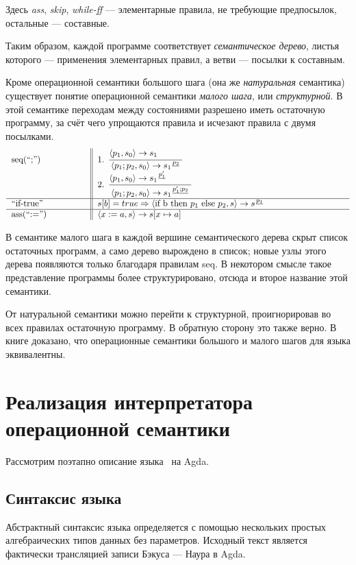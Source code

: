 \documentclass[aps,12pt,final,oneside,onecolumn,musixtex,superscriptaddress,centertags]{article}
\newcommand{\ccode}[1]{\mbox{\texttt{#1}}}
\begin{document}
    Здесь \emph{ass}, \emph{skip}, \emph{while-ff} --- элементарные правила, не требующие предпосылок, остальные --- составные.

    Таким образом, каждой программе соответствует \emph{семантическое дерево}, листья которого --- применения элементарных правил, а ветви --- посылки к составным.

    \vspace{4mm}
    Кроме операционной семантики большого шага (она же \emph{натуральная} семантика) существует понятие операционной семантики \emph{малого шага}, или \emph{структурной}. В этой семантике переходам между состояниями разрешено иметь остаточную программу, за счёт чего упрощаются правила и исчезают правила с двумя посылками.
    \begin{align*}
       \begin{tabular}{ p{3cm} || p{10cm} }
          seq(``;'')  & 1. $\seqssn$ \\
                      & 2. $\seqssj$ \\
          \hline
          ``if-true'' & $\iftruess$  \\
          \hline
          ass(``:='') & $\assignns$  \\
       \end{tabular}
    \end{align*}

    В семантике малого шага в каждой вершине семантического дерева скрыт список остаточных программ, а само дерево вырождено в список; новые узлы этого дерева появляются только благодаря правилам seq. В некотором смысле такое представление программы более структурировано, отсюда и второе название этой семантики.

    От натуральной семантики можно перейти к структурной, проигнорировав во всех правилах остаточную программу. В обратную сторону это также верно. В книге\cite{Nielson:1992:SAF:129085} доказано, что операционные семантики большого и малого шагов для языка \While \ccode{ }эквивалентны.

  \newpage
  \section{Реализация интерпретатора операционной семантики}

  Рассмотрим поэтапно описание языка \While \ccode{ }на Agda.

  \subsection{Синтаксис языка \While}
     Абстрактный синтаксис языка определяется с помощью нескольких простых алгебраических типов данных без параметров. Исходный текст является фактически трансляцией записи Бэкуса --- Наура в Agda.
\end{document}
